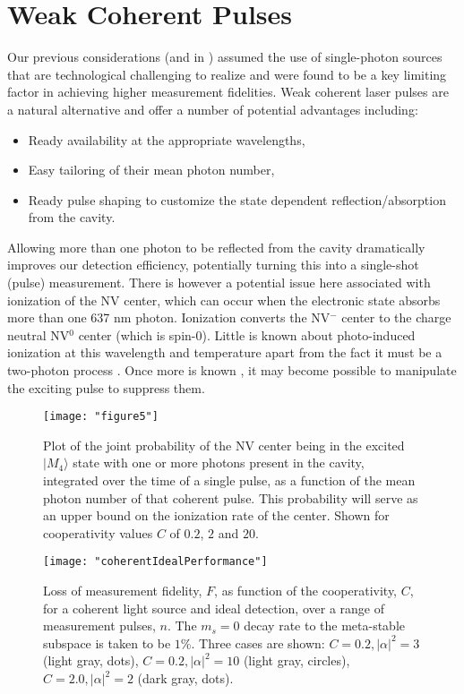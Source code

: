 \documentclass[aps,pra,amsmath,amssymb,reprint,superscriptaddress,tightenlines]{revtex4-1}
\begin{document}
\section{Weak Coherent Pulses} 
\label{sec:wcp}

Our previous considerations (and in \cite{Nemoto14}) assumed the use of single-photon sources that are technological challenging to realize and were found to be a key limiting factor in achieving higher measurement fidelities. Weak coherent laser pulses are a natural alternative \cite{Volz11} and offer a number of potential advantages including:
\begin{itemize}
\item Ready availability at the appropriate wavelengths, 
\item Easy tailoring of their mean photon number,
\item Ready pulse shaping to customize the state dependent reflection/absorption from the cavity.
\end{itemize}
Allowing more than one photon to be reflected from the cavity dramatically improves our detection efficiency,  potentially turning this into a single-shot (pulse) measurement. There is however a potential issue here associated with ionization of the NV center, which can occur when the electronic state absorbs more than one 637 nm photon. Ionization converts the  NV$^-$ center to the charge neutral NV$^0$ center (which is spin-0). Little is known about photo-induced ionization at this wavelength and temperature apart from the fact it must be a two-photon process \cite{Beha12,Siyushev13,Aslam13}.  Once more is known , it may become possible to manipulate the exciting pulse to suppress them. 

\begin{figure}[htb]
\texttt{[image: "figure5"]}
\caption{Plot of the joint probability of the NV center being in the excited $|M_4\rangle$ state with one or more photons present in the cavity, integrated over the time of a single pulse, as a function of the mean photon number of that coherent pulse. This probability will serve as an upper bound on the ionization rate of the center. Shown for cooperativity values $C$ of $0.2$, $2$ and $20$.}
\label{fig:wcp}
\end{figure}


\begin{figure}[b]
\texttt{[image: "coherentIdealPerformance"]}
\caption{\label{fig:coherent_ideal_performance} Loss of measurement fidelity, $F$, as function of the cooperativity, $C$, for a coherent light source and ideal detection, over a range of measurement pulses, $n$. The $m_{s}=0$ decay rate to the meta-stable subspace is taken to be $1$\%. Three cases are shown: $C=0.2,\left|\alpha\right|^{2}=3$ (light gray, dots), $C=0.2,\left|\alpha\right|^{2}=10$ (light gray, circles), $C=2.0,\left|\alpha\right|^{2}=2$ (dark gray, dots).}
\end{figure}
\end{document}
